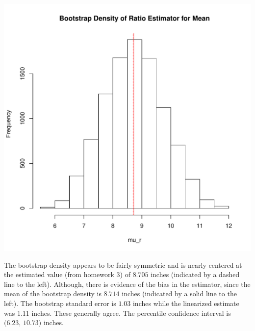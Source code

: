 \documentclass[usenames,dvipsnames]{homework}
\begin{document}
\begin{solution}
  \begin{minipage}{.45\textwidth}
    \includegraphics[width=\textwidth]{bootstrap.pdf}
  \end{minipage}
  \begin{minipage}{.45\textwidth}
    The bootstrap density appears to be fairly symmetric and is nearly centered at
    the estimated value (from homework 3) of $8.705$ inches (indicated by a
    dashed line to the left).  Although, there is evidence of the bias in the
    estimator, since the mean of the bootstrap density is $8.714$ inches
    (indicated by a solid line to the left).  The bootstrap standard error is
    $1.03$ inches while the linearized estimate was 1.11 inches.  These generally agree.
    The percentile confidence interval is
    $\big(6.23,\,10.73\big)$ inches. 
  \end{minipage}
\end{solution}
\newpage
{}
\end{document}
